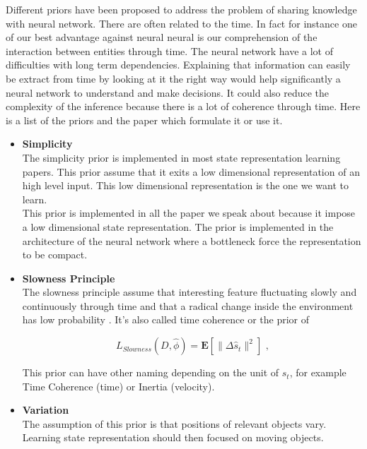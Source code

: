 \documentclass[a4paper]{article}
\begin{document}
Different priors have been proposed to address the problem of sharing knowledge with neural network. There are often related to the time. In fact for instance one of our best advantage against neural neural is our comprehension of the interaction between entities through time. The neural network have a lot of difficulties with long term dependencies. Explaining that information can easily be extract from time by looking at it the right way would help significantly a neural network to understand and make decisions. It could also reduce the complexity of the inference because there is a lot of coherence through time. Here is a list of the priors and the paper which formulate it or use it.\\

\begin{itemize}
\item  \textbf{Simplicity}\\
The simplicity prior is implemented in most state representation learning papers. This prior assume that it exits a low dimensional representation of an high level input. This low dimensional representation is the one we want to learn.\\
This prior is implemented in all the paper we speak about because it impose a low dimensional state representation. The prior is implemented in the architecture of the neural network where a bottleneck force the representation to be compact.


\item \textbf{Slowness Principle}\\
The slowness principle assume that interesting feature fluctuating slowly and continuously through time and that a radical change inside the environment has low probability \cite{Wiskott02,Kompella11}. It's also called time coherence or the prior of 

\begin{equation}
L_{Slowness}(D,\hat{\phi})=\mathbf{E}[\parallel\Delta\hat{s}_{t}\parallel^2] \mbox{ ,}
\label{equation_Prior_Temporel}
\end{equation}

This prior can have other naming depending on the unit of $s_t$, for example Time Coherence (time) or Inertia (velocity).

\item \textbf{Variation}\\

The assumption of this prior is that positions of relevant objects vary. Learning state representation should then focused on moving objects.


\end{itemize}
\end{document}
